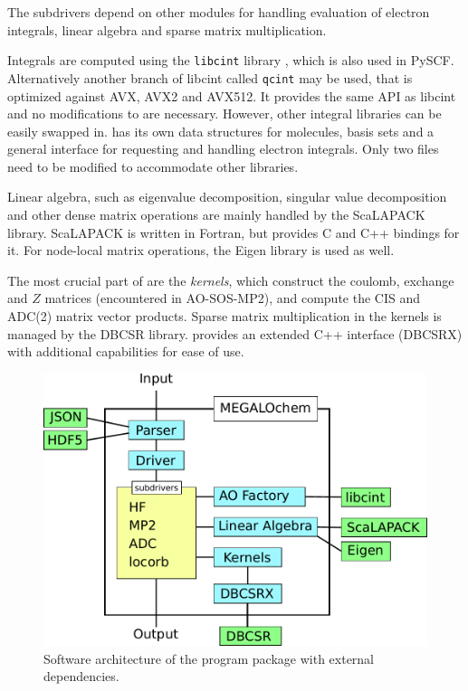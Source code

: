 The subdrivers depend on other modules for handling evaluation of electron integrals, linear algebra and sparse matrix multiplication. 

Integrals are computed using the \texttt{libcint} library \cite{Sun2015}, which is also used in PySCF. Alternatively another branch of libcint called \texttt{qcint} may be used, that is optimized against AVX, AVX2 and AVX512. It provides the same API as libcint and no modifications to \mchem{} are necessary. However, other integral libraries can be easily swapped in. \mchem{} has its own data structures for molecules, basis sets and a general interface for requesting and handling electron integrals. Only two files need to be modified to accommodate other libraries. 

Linear algebra, such as eigenvalue decomposition, singular value decomposition and other dense matrix operations are mainly handled by the ScaLAPACK library. ScaLAPACK is written in Fortran, but \mchem{} provides C and C++ bindings for it. For node-local matrix operations, the Eigen library is used as well. 

The most crucial part of \mchem{} are the \emph{kernels}, which construct the coulomb, exchange and $Z$ matrices (encountered in AO-SOS-MP2), and compute the CIS and ADC(2) matrix vector products. Sparse matrix multiplication in the kernels is managed by the DBCSR library. \mchem{} provides an extended C++ interface (DBCSRX) with additional capabilities for ease of use. 

\begin{figure}
\centering
\includegraphics[scale=0.8]{Pics/megasoft}
\caption{Software architecture of the \mchem{} program package with external dependencies.}
\label{fig:MEGAARCH}
\end{figure}

